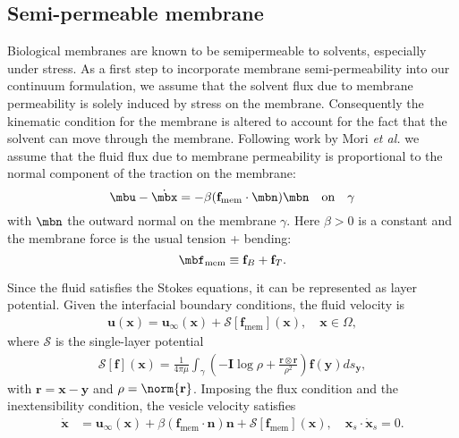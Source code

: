 \documentclass[11pt]{article}
\newcommand{\ff}{\mathbf{f}}
\newcommand{\nn}{\mathbf{n}}
\newcommand{\uu}{\mathbf{u}}
\newcommand{\xx}{\mathbf{x}}
\newcommand{\rr}{\mathbf{r}}
\renewcommand{\SS}{\mathcal{S}}
\newcommand{\yy}{\mathbf{y}}
\begin{document}
\subsection{Semi-permeable membrane}
Biological membranes are known to be semipermeable to solvents, especially under stress. As a first step to incorporate membrane semi-permeability
into our continuum formulation, we assume that the solvent flux due to membrane permeability is solely induced by stress on the membrane.
Consequently the kinematic condition for the membrane is altered to account for  the fact that the solvent can move through the membrane.
Following work by Mori {\it et al.} we assume that the fluid flux due to membrane permeability is proportional to the normal component of the
traction on the membrane:
%
\begin{equation}
 \mbu - \dot{\mbx} = - \beta (\ff_\text{mem} \cdot \mbn) \mbn \quad\text{on}\quad\gamma
 \end{equation}
%
with $\mbn$ the outward normal on the membrane $\gamma$.
Here $\beta>0$ is a constant and the membrane force is the usual tension + bending:
%
\begin{equation}  
\mbf_\text{mem}\equiv  \ff_B + \ff_T.
\end{equation}

Since the fluid satisfies the Stokes equations, it can be represented as
layer potential. Given the interfacial boundary
conditions, the fluid velocity is
\begin{align}
  \uu(\xx) = \uu_\infty(\xx) + \SS[\ff_\mathrm{mem}](\xx), \quad
    \xx \in \Omega,
\end{align}
where $\SS$ is the single-layer potential
\begin{align}
  \SS[\ff](\xx) = \frac{1}{4\pi\mu} \int_{\gamma} \left(
    -\mathbf{I} \log\rho + \frac{\rr \otimes \rr}{\rho^2} \right)
    \ff(\yy) ds_{\yy},
\end{align}
with $\rr = \xx - \yy$ and $\rho = \norm{\rr}$. Imposing the flux
condition and the inextensibility condition, the
vesicle velocity satisfies
\begin{align}
  \label{eqn:vesVelocity}
  \dot{\xx} &= \uu_\infty(\xx) + \beta (\ff_\mathrm{mem}\cdot\nn)\nn
  + \SS [\ff_\mathrm{mem}](\xx),  \quad
  \xx_s \cdot \dot{\xx}_s = 0.
\end{align}
\end{document}
